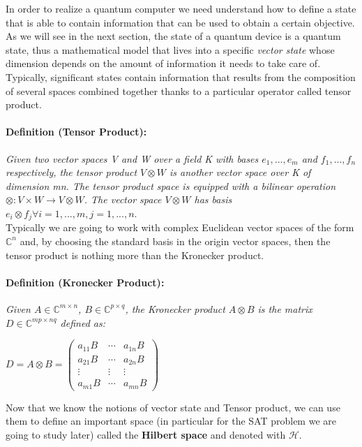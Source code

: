 \documentclass[english]{article}
\begin{document}
			In order to realize a quantum computer we need understand how to define a state that is able to contain information that can be used to obtain a certain objective. As we will see in the next section, the state of a quantum device is a quantum state, thus a mathematical model that lives into a specific \emph{vector state} whose dimension depends on the amount of information it needs to take care of. Typically, significant states contain information that results from the composition of several spaces combined together thanks to a particular operator called tensor product.
			
			\paragraph{Definition (Tensor Product):} \emph{Given two vector spaces V and W over a field K with bases $e_1,..., e_m$ and
$f_1,..., f_n$ respectively, the tensor product $V \otimes W$ is another vector space over K of dimension
mn. The tensor product space is equipped with a bilinear operation $\otimes : V \times W \rightarrow V \otimes W$. The
vector space $V \otimes W$ has basis $e_i \otimes f_j \forall i = 1,...,m, j = 1,...,n$}. \\
			
			Typically we are going to work with complex Euclidean vector spaces of the form $\mathbb{C}^n$ and, by choosing the standard basis in the origin vector spaces, then the tensor product is nothing more than the Kronecker product.
			
			\paragraph{Definition (Kronecker Product):} \emph{Given $A \in \mathbb{C}^{m\times n}$, $B \in \mathbb{C}^{p\times q}$, the Kronecker product $A \otimes B$ is the matrix $D \in \mathbb{C}^{mp\times nq}$ defined as:}
			\begin{center}
				$
				D = A\otimes B =
				\begin{pmatrix}
				a_{11}B & \cdots & a_{1n}B \\
				a_{21}B & \cdots  & a_{2n}B \\
				\vdots & \vdots & \vdots \\
				a_{m1}B & \cdots & a_{mn}B
				\end{pmatrix}
				$
			\end{center}
		
			Now that we know the notions of vector state and Tensor product, we can use them to define an important space (in particular for the SAT problem we are going to study later) called the \textbf{Hilbert space} and denoted with $\mathcal{H}$.
			
\end{document}

